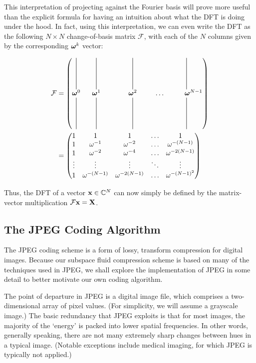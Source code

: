 This interpretation of projecting against the Fourier basis will prove more useful than the explicit formula for having an intuition about what the DFT is doing under the hood.
In fact, using this interpretation, we can even write the DFT as the following $N \times N$ change-of-basis matrix $\mathcal{F}$, with each of the $N$ columns given by the corresponding $\boldsymbol{\omega}^k$ vector:

\begin{align}
	\mathcal{F} &= \begin{pmatrix}
    		\vertbar & \ \  \vertbar & \ \ \ \ \ \ \ \ \  \vertbar & & \vertbar \\
    		\boldomega^0  & \ \   \boldomega^1  & \ \ \ \ \ \ \ \ \  \boldomega^2 & \ \ \ \ \ \dots & \ \ \ \ \ \ \boldomega^{N-1} \\
 		\vertbar & \ \  \vertbar & \ \ \ \ \ \ \ \ \  \vertbar & & \vertbar 
  	\end{pmatrix} \\	
	&= \begin{pmatrix}
	1 & 1 & 1 & \dots & 1 \\
	1 & \omega^{-1} & \omega^{-2} & \dots & \omega^{-(N-1)} \\
	1 & \omega^{-2} & \omega^{-4} & \dots & \omega^{-2(N-1)} \\
	\vdots & \vdots & \vdots & \ddots & \vdots \\
	1 & \omega^{-(N-1)} & \omega^{-2(N-1)} & \dots & \omega^{-{(N-1)}^2}
	\end{pmatrix}	
\end{align}

Thus, the DFT of a vector $\mathbf{x} \in \mathbb{C}^N$ can now simply be defined by the matrix-vector multiplication $\mathcal{F} \mathbf{x} = \mathbf{X}$.

\subsection{The JPEG Coding Algorithm}
The JPEG coding scheme is a form of lossy, transform compression for digital images. Because our subspace fluid compression scheme is based on many of the techniques used in JPEG, we shall explore the implementation of JPEG in some detail to better motivate our own coding algorithm. 

The point of departure in JPEG is a digital image file, which comprises a two-dimensional array of pixel values. (For simplicity, we will assume a grayscale image.) The basic redundancy that JPEG exploits is that for most images, the majority of the `energy' is packed into lower spatial frequencies. In other words, generally speaking, there are not many extremely sharp changes between hues in a typical image. (Notable exceptions include medical imaging, for which JPEG is typically not applied.) 












